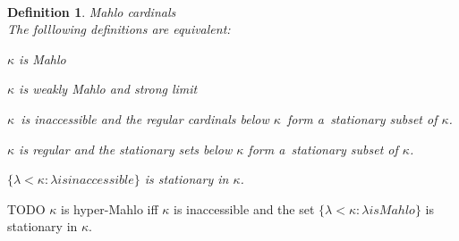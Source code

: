 \documentclass[12pt,a4paper]{article}
\newtheorem{theorem}{Theorem}[section]
\newtheorem{definition}[theorem]{Definition}
\newenvironment{proof}
{\noindent \textit{Proof.}}
{\hspace*{\fill} $\Box$}
\renewcommand{\iff}{\leftrightarrow}
\newcommand{\bce}{\begin{compactenum}}
\newcommand{\ece}{\end{compactenum}}
\begin{document}
\

\begin{definition}{Mahlo cardinals}\label{def:mahlo}\\
The folllowing definitions are equivalent:
\bce[(i)]
\item $\kappa$ is Mahlo
\item $\kappa$ is weakly Mahlo and strong limit
\item $\kappa$ is inaccessible and the regular cardinals below $\kappa$ form a~stationary subset of $\kappa$.
\item $\kappa$ is regular and the stationary sets below $\kappa$ form a~stationary subset of $\kappa$.
\item $\{\lambda < \kappa : \lambda is inaccessible\}$ is stationary in $\kappa$.  %
\ece
\end{definition}

{\color{red}
\begin{comment}

\begin{theorem}\label{th:refl_mahlo}
$\kappa$ is Mahlo $\iff$ for any $R \subset V_\kappa$ there is an inaccessible cardinal $\alpha < \kappa$ such that $\langle V_\alpha, \in, R \cap V_\alpha \rangle \prec \langle V_\kappa, \in, R \rangle$.
\end{theorem}

\begin{proof}
Start with the proof of (\ref{th:refl_inaccessible}) and add the following:\\
$\kappa$ is Mahlo by the following contradiction. If not, there would be a~$C$ closed unbounded in $\kappa$ containing no inaccessible cardinals. By the hypothesis there is in inaccessible $\alpha < \kappa$ such that $\langle V_\alpha, \in, C \cap V_\alpha \rangle \prec \langle V_\kappa, \in, C \rangle$. By elementarity $C \cap \alpha$ is unbounded in $\alpha$. But then, $\alpha \in C$, which is the contradiction we need.
\end{proof}

\

\end{comment}
}

TODO $\kappa$ is hyper-Mahlo iff $\kappa$ is inaccessible and the set $\{\lambda < \kappa : \lambda is Mahlo\}$ is stationary in $\kappa$.

\end{document}
